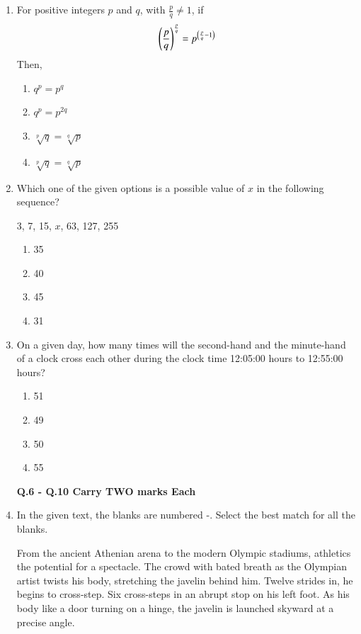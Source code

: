 \documentclass[journal,12pt,onecolumn]{article}
\theoremstyle{remark}
\begin{document}
\begin{enumerate}
    \item For positive integers $p$ and $q$, with $\frac{p}{q} \neq 1$, if 
    \begin{align}
    \left(\frac{p}{q}\right)^{\frac{p}{q}} = p^{\left(\frac{p}{q}-1\right)}
    \end{align} Then,

    \hfill{}
    \begin{enumerate}
        \item $q^p = p^q$
        \item $q^p = p^{2q}$
        \item $\sqrt[p]{q} = \sqrt[q]{p}$
        \item $\sqrt[p]{q} = \sqrt[q]{p}$
    \end{enumerate}

    \item Which one of the given options is a possible value of $x$ in the following sequence?
    
    3, 7, 15, $x$, 63, 127, 255

    \hfill{}
    \begin{enumerate}
        \item 35
        \item 40
        \item 45
        \item 31
    \end{enumerate}

    \item On a given day, how many times will the second-hand and the minute-hand of a clock cross each other during the clock time 12:05:00 hours to 12:55:00 hours?
    
    \hfill{}
    \begin{enumerate}
        \item 51
        \item 49
        \item 50
        \item 55
    \end{enumerate}

\textbf{Q.6 - Q.10 Carry TWO marks Each}

    \item In the given text, the blanks are numbered -. Select the best match for all the blanks.
    
    From the ancient Athenian arena to the modern Olympic stadiums, athletics \underline{\hspace{2cm}}  the potential for a spectacle. The crowd \underline{\hspace{2cm}}  with bated breath as the Olympian artist twists his body, stretching the javelin behind him. Twelve strides in, he begins to cross-step. Six cross-steps \underline{\hspace{2cm}}  in an abrupt stop on his left foot. As his body \underline{\hspace{2cm}}  like a door turning on a hinge, the javelin is launched skyward at a precise angle.


\end{enumerate}
\end{document}
